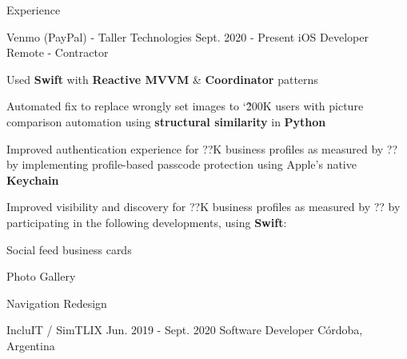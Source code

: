 \documentclass{curriculum}
\begin{document}

\begin{cvsection}{Experience}


    \makesectionitemheader
        {Venmo (PayPal) - Taller Technologies}    {Sept. 2020 - Present}
        {iOS Developer}   {Remote - Contractor}
        \begin{sectionitemlist}
        \item{Used \textbf{Swift} with \textbf{Reactive MVVM} \& \textbf{Coordinator} patterns}
        \item{Automated fix to replace wrongly set images to \char`\~ 200K users with picture comparison automation using \textbf{structural similarity} in \textbf{Python}}
        \item{Improved authentication experience for ??K business profiles as measured by ?? by implementing profile-based passcode protection using Apple's native \textbf{Keychain}}
        \item{Improved visibility and discovery for ??K business profiles as measured by ?? by participating in the following developments, using \textbf{Swift}:}
            \begin{colsectionitemlist}{3}
            \item{Social feed business cards}
            \item{Photo Gallery}
            \item{Navigation Redesign}
            \end{colsectionitemlist}
        \end{sectionitemlist}


    \makesectionitemheader
        {IncluIT / SimTLIX}                     {Jun. 2019 - Sept. 2020}
        {Software Developer}                    {Córdoba, Argentina}

        \begin{sectionitemlist}


\end{sectionitemlist}
\end{cvsection}
\end{document}
